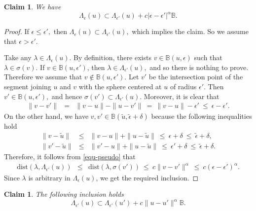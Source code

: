 \documentclass[10pt,reqno]{amsart}
\theoremstyle{break-italic}
\theoremstyle{break-italic}
\theoremstyle{break-italic}
\theoremstyle{break-italic}
\theoremstyle{break-italic}
\theoremstyle{break-italic}
\theoremstyle{break-italic}
\theoremstyle{break-italic}
\theoremstyle{break-roman}
\theoremstyle{standard}
\newtheorem{claim}[satz]{Claim}
\theoremstyle{varthm-roman}
\theoremstyle{varthm-italic}
\theoremstyle{varthm-roman-break}
\theoremstyle{varthm-italic-break}
\theoremstyle{varthm-roman-no-punctuation}
\theoremstyle{varthm-italic-no-punctuation}
\numberwithin{equation}{section}
\begin{document}
\begin{claim} \label{claim1}
We have
$$\Lambda_{\epsilon}(u)  \subset \Lambda_{\epsilon'}(u) + c  |\epsilon-\epsilon'|^\alpha \mathbb{B}.$$
\end{claim}
\begin{proof}
If $\epsilon \leq \epsilon',$ then $\Lambda_\epsilon(u) \subset \Lambda_{\epsilon'}(u),$ which implies the claim. So we assume that $\epsilon >  \epsilon'.$

Take any $\lambda \in \Lambda_\epsilon({u}).$ By definition, there exists $v \in \mathbb B({u}, \epsilon)$ such that $\lambda \in \sigma(v).$  If $v\in \mathbb B(u, \epsilon')$, then $\lambda \in \Lambda_{\epsilon'}(u),$ and so there is nothing to prove. Therefore we assume that $v \not \in \mathbb B(u, \epsilon')$.  Let  $v'$ be the intersection point of the segment joining $u$ and $v$ with the sphere centered at $u$ of radius $\epsilon'.$ Then $v' \in \mathbb B({u}, \epsilon'),$ and hence $\sigma(v')\subset \Lambda_{\epsilon'}({u}).$  Moreover, it is clear that
\begin{eqnarray*}
\|v- v'\| & = & \|v - u\| - \|u - v'\| \ = \ \|v - u\| - \epsilon' \ \leq \ \epsilon - \epsilon'.
\end{eqnarray*}
On the other hand, we have $v, v'\in \mathbb B(\tilde{u}, \tilde{\epsilon} + \delta)$ because the following inequalities hold
\begin{eqnarray*}
\|v - \tilde{u}\| & \leq & \|v - u\| + \|u - \tilde{u}\| \ \leq \ \epsilon + \delta \ \le \ \tilde{\epsilon} + \delta, \\
\|v' - \tilde{u}\| & \leq & \|v' - u\| + \|u - \tilde{u}\| \ \leq \ \epsilon' + \delta \ \le \ \tilde{\epsilon} + \delta.
\end{eqnarray*}
Therefore, it follows from  \eqref{equ-pseudo} that
\begin{eqnarray*}
\mbox{dist}(\lambda, \Lambda_{\epsilon'}({u})) & \leq & \mbox{dist}(\lambda, \sigma(v')) \ \leq \ c \|v - v'\|^\alpha \ \leq \ c (\epsilon - \epsilon')^\alpha.
\end{eqnarray*}
Since $\lambda$ is arbitrary in $\Lambda_\epsilon({u})$, we get the required inclusion.
\end{proof}

\begin{claim} \label{claim2}
The following inclusion holds
$$\Lambda_{\epsilon'}(u)  \subset \Lambda_{\epsilon'}(u') + c  \|u-u'\|^\alpha \mathbb{B}.$$
\end{claim}
\end{document}
